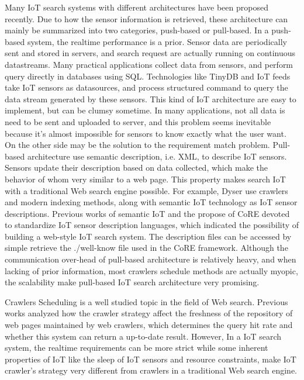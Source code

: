 \documentclass[conference]{IEEEtran}
\begin{document}
Many IoT search systems with different architectures have been proposed recently.
Due to how the sensor information is retrieved, these  architecture can mainly be summarized into two categories, push-based or pull-based.
In a push-based system, the realtime performance is a prior. Sensor data are periodically sent and stored in servers, and search request are actually running on continuous datastreams. Many practical applications collect data from sensors, and perform query directly in databases using SQL. Technologies like TinyDB\cite{TinyDB} and IoT feeds\cite{Whitehouse2006} take IoT sensors as datasources, and process structured command to query the data stream generated by these sensors. This kind of IoT architecture are easy to implement, but can be clumsy sometime. In many applications, not all data is need to be sent and uploaded to server, and this problem seems inevitable because it's almost impossible for sensors to know exactly what the user want.
On the other side may be the solution to the requirement match problem.
Pull-based architecture use semantic description, i.e. XML, to describe IoT sensors. Sensors update their description based on data collected, which make the behavior of whom very similar to a web page. This property makes search IoT with a traditional Web search engine possible. For example, Dyser\cite{Dyser} use crawlers and modern indexing methods, along with semantic IoT technology as IoT sensor descriptions. Previous works of semantic IoT\cite{Compton2012} and the propose of CoRE\cite{CoREWorkingGroup2012} devoted to standardize IoT sensor description languages, which indicated the possibility of building a web-style IoT search system. The description files can be accessed by simple retrieve the ./well-know file used in the CoRE framework. 
Although the communication over-head of pull-based architecture is relatively heavy, and when lacking of prior information, most crawlers schedule methods are actually myopic, the scalability make pull-based IoT search architecture very promising.


Crawlers Scheduling is a well studied topic in the field of Web search. Previous works\cite{Cho2000}\cite{Wolf2002}\cite{Challenger2004} analyzed how the crawler strategy affect the freshness of the repository of web pages maintained by web crawlers, which determines the query hit rate and whether this system can return a up-to-date result. However, In a IoT search system, the realtime requirements can be more strict while some inherent properties of IoT like the sleep of IoT sensors and resource constraints, make IoT crawler's strategy very different from crawlers in a traditional Web search engine. 
\end{document}
